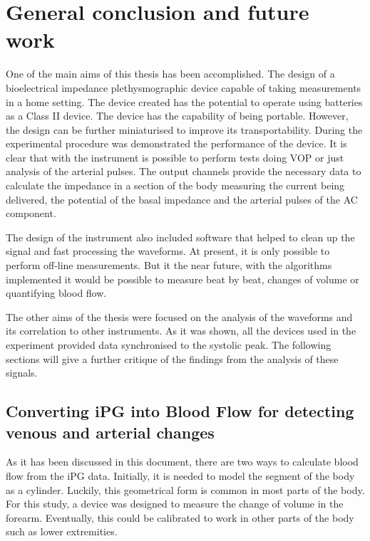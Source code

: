 
\chapter{General conclusion and future work}  %

\ifpdf
    \graphicspath{{Chapter11/Figs/Raster/}{Chapter11/Figs/PDF/}{Chapter11/Figs/}}
\else
    \graphicspath{{Chapter11/Figs/Vector/}{Chapter11/Figs/}}
\fi

One of the main aims of this thesis has been accomplished. The design of a bioelectrical impedance plethysmographic device capable of taking measurements in a home setting. The device created has the potential to operate using batteries as a Class II device. The device has the capability of being portable. However, the design can be further miniaturised to improve its transportability.  During the experimental procedure was demonstrated the performance of the device. It is clear that with the instrument is possible to perform tests doing VOP or just analysis of the arterial pulses. The output channels provide the necessary data to calculate the impedance in a section of the body measuring the current being delivered, the potential of the basal impedance and the arterial pulses of the AC component. 

The design of the instrument also included software that helped to clean up the signal and fast processing the waveforms. At present, it is only possible to perform off-line measurements. But it the near future, with the algorithms implemented it would be possible to measure beat by beat, changes of volume or quantifying blood flow.

The other aims of the thesis were focused on the analysis of the waveforms and its correlation to other instruments.  As it was shown, all the devices used in the experiment provided data synchronised to the systolic peak. The following sections will give a further critique of the findings from the analysis of these signals. 


\section{Converting iPG into Blood Flow for detecting venous and arterial changes} %
\label{section discussion 1}
As it has been discussed in this document, there are two ways to calculate blood flow from the iPG data. Initially, it is needed to model the segment of the body as a cylinder. Luckily, this geometrical form is common in most parts of the body. For this study, a device was designed to measure the change of volume in the forearm. Eventually, this could be calibrated to work in other parts of the body such as lower extremities. 

